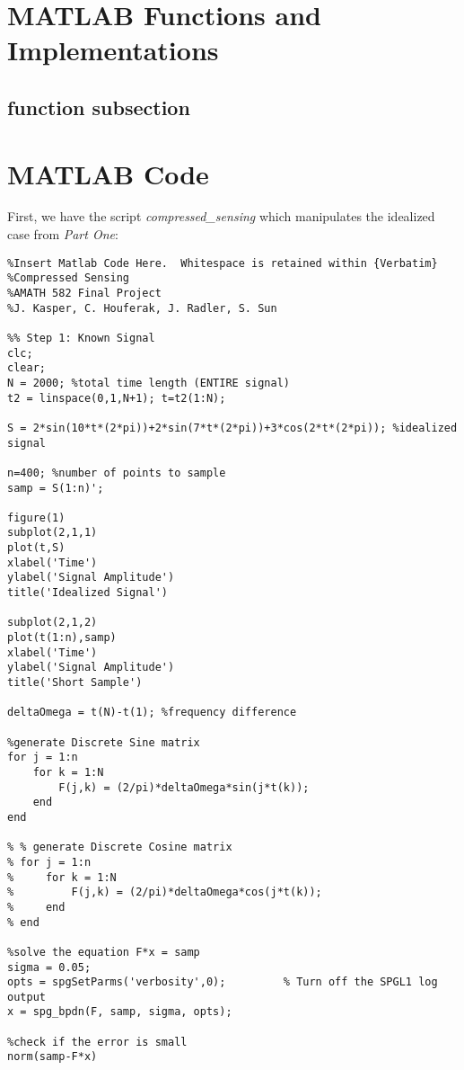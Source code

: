 \documentclass[11pt]{article}
\begin{document}
\begin{appendices}

\section{MATLAB Functions and Implementations}

\subsection*{function subsection}

\section{MATLAB Code}
First, we have the script \emph{compressed\_sensing} which manipulates the idealized case from \emph{Part One}:\\

\begin{verbatim}
%Insert Matlab Code Here.  Whitespace is retained within {Verbatim}
%Compressed Sensing
%AMATH 582 Final Project
%J. Kasper, C. Houferak, J. Radler, S. Sun

%% Step 1: Known Signal
clc;
clear;
N = 2000; %total time length (ENTIRE signal)
t2 = linspace(0,1,N+1); t=t2(1:N);

S = 2*sin(10*t*(2*pi))+2*sin(7*t*(2*pi))+3*cos(2*t*(2*pi)); %idealized signal

n=400; %number of points to sample
samp = S(1:n)';

figure(1)
subplot(2,1,1)
plot(t,S)
xlabel('Time')
ylabel('Signal Amplitude')
title('Idealized Signal')

subplot(2,1,2)
plot(t(1:n),samp)
xlabel('Time')
ylabel('Signal Amplitude')
title('Short Sample')

deltaOmega = t(N)-t(1); %frequency difference

%generate Discrete Sine matrix
for j = 1:n
    for k = 1:N
        F(j,k) = (2/pi)*deltaOmega*sin(j*t(k));
    end
end

% % generate Discrete Cosine matrix
% for j = 1:n
%     for k = 1:N
%         F(j,k) = (2/pi)*deltaOmega*cos(j*t(k));
%     end
% end

%solve the equation F*x = samp
sigma = 0.05;
opts = spgSetParms('verbosity',0);         % Turn off the SPGL1 log output
x = spg_bpdn(F, samp, sigma, opts);

%check if the error is small
norm(samp-F*x)


\end{verbatim}
\end{appendices}
\end{document}
